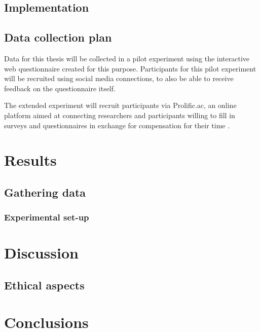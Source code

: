\documentclass[twoside]{uva-inf-bachelor-thesis}
\theoremstyle{definition}
\begin{document}
\section{Implementation}

\section{Data collection plan}
Data for this thesis will be collected in a pilot experiment using the interactive web questionnaire created for this purpose. Participants for this pilot experiment will be recruited using social media connections, to also be able to receive feedback on the questionnaire itself.

The extended experiment will recruit participants via Prolific.ac, an online platform aimed
at connecting researchers and participants willing to fill in surveys and questionnaires in exchange for compensation for their time \cite{PALAN201822}.



\chapter{Results}
\section{Gathering data}
\subsection{Experimental set-up}


\chapter{Discussion}
\section{Ethical aspects}

\chapter{Conclusions}

\printbibliography
{}
\end{document}
